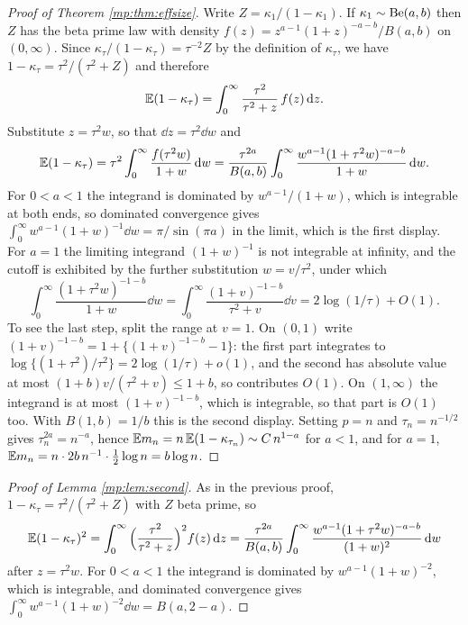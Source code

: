 \begin{proof}[Proof of Theorem \ref{mp:thm:effsize}]
Write $Z=\kappa_1/(1-\kappa_1)$. If $\kappa_1\sim\mathrm{Be}(a,b)$ then $Z$ has the beta prime law
with density $f(z)=z^{a-1}(1+z)^{-a-b}/B(a,b)$ on $(0,\infty)$. Since
$\kappa_\tau/(1-\kappa_\tau)=\tau^{-2}Z$ by the definition of $\kappa_\tau$, we have
$1-\kappa_\tau=\tau^2/(\tau^2+Z)$ and therefore
\[
\mathbb{E}(1-\kappa_\tau)=\int_0^\infty \frac{\tau^2}{\tau^2+z}\,f(z)\,\mathrm{d} z .
\]
Substitute $z=\tau^2 w$, so that $\dd z=\tau^2\dd w$ and
\[
\mathbb{E}(1-\kappa_\tau)=\tau^{2}\int_0^\infty\frac{f(\tau^2w)}{1+w}\,\mathrm{d} w
=\frac{\tau^{2a}}{B(a,b)}\int_0^\infty\frac{w^{a-1}(1+\tau^2w)^{-a-b}}{1+w}\,\mathrm{d} w .
\]
For $0<a<1$ the integrand is dominated by $w^{a-1}/(1+w)$, which is integrable at both ends,
so dominated convergence gives
$\int_0^\infty w^{a-1}(1+w)^{-1}\dd w = \pi/\sin(\pi a)$ in the limit, which is the first
display. For $a=1$ the limiting integrand $(1+w)^{-1}$ is not integrable at infinity, and the cutoff
is exhibited by the further substitution $w=v/\tau^2$, under which
\[
\int_0^\infty\frac{(1+\tau^2w)^{-1-b}}{1+w}\dd w
=\int_0^\infty\frac{(1+v)^{-1-b}}{\tau^2+v}\dd v
=2\log(1/\tau)+O(1).
\]
To see the last step, split the range at $v=1$. On $(0,1)$ write
$(1+v)^{-1-b}=1+\{(1+v)^{-1-b}-1\}$: the first part integrates to
$\log\{(1+\tau^2)/\tau^2\}=2\log(1/\tau)+o(1)$, and the second has absolute value at most
$(1+b)v/(\tau^2+v)\le1+b$, so contributes $O(1)$. On $(1,\infty)$ the integrand is at most
$(1+v)^{-1-b}$, which is integrable, so that part is $O(1)$ too. With $B(1,b)=1/b$ this is the
second display. Setting $p=n$ and $\tau_n=n^{-1/2}$ gives $\tau_n^{2a}=n^{-a}$, hence
$\mathbb{E} m_n = n\,\mathbb{E}(1-\kappa_{\tau_n})\sim C\,n^{1-a}$ for $a<1$, and for $a=1$,
$\mathbb{E} m_n = n\cdot 2b\,n^{-1}\cdot\tfrac12\log n = b\log n$.
\end{proof}

\begin{proof}[Proof of Lemma \ref{mp:lem:second}]
As in the previous proof, $1-\kappa_\tau=\tau^2/(\tau^2+Z)$ with $Z$ beta prime, so
\[
\mathbb{E}(1-\kappa_\tau)^2=\int_0^\infty\Big(\frac{\tau^2}{\tau^2+z}\Big)^2 f(z)\,\mathrm{d} z
=\frac{\tau^{2a}}{B(a,b)}\int_0^\infty\frac{w^{a-1}(1+\tau^2w)^{-a-b}}{(1+w)^{2}}\,\mathrm{d} w
\]
after $z=\tau^2w$. For $0<a<1$ the integrand is dominated by $w^{a-1}(1+w)^{-2}$, which is
integrable, and dominated convergence gives
$\int_0^\infty w^{a-1}(1+w)^{-2}\dd w=B(a,2-a)$.
\end{proof}

